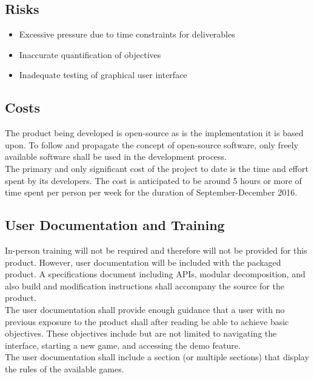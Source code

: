 \documentclass{article}
\begin{document}
		\subsection{Risks}
		\begin{itemize}
			\itemsep0em
			\item Excessive pressure due to time constraints for deliverables
			\item Inaccurate quantification of objectives
			\item Inadequate testing of graphical user interface
		\end{itemize}

		\subsection{Costs}
			\indent The product being developed is open-source as is the implementation
			it is based upon. To follow and propagate the concept of open-source
			software, only freely available software shall be used in the development
			process.\\
			\indent The primary and only significant cost of the project to date is the
			time and effort spent by its developers. The cost is anticipated to be around
			5 hours or more of time spent per person per week for the duration of
			September-December 2016.\\

		\subsection{User Documentation and Training}
			\indent In-person training will not be required and therefore will not be
			provided for this product. However, user documentation will be included with
			the packaged product. A specifications document including APIs, modular
			decomposition, and also build and modification instructions shall accompany
			the source for the product.\\
	 		\indent The user documentation shall provide enough guidance that a user
			with no previous exposure to the product shall after reading be able to
			achieve basic objectives. These objectives include but are not limited to
			navigating the interface, starting a new game, and accessing the demo
			feature.\\
	 		\indent The user documentation shall include a section (or multiple
			sections) that display the rules of the available games.
\end{document}
